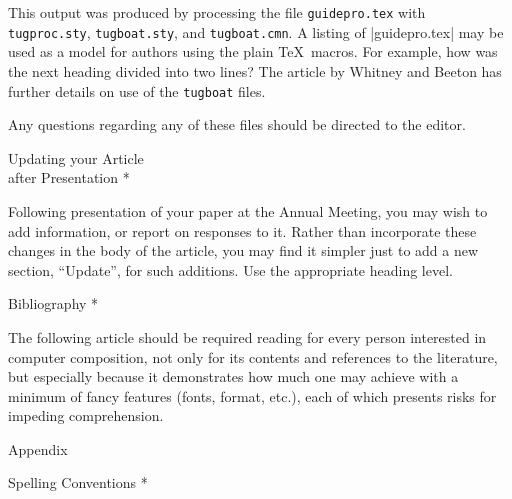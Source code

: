 This output was produced by processing the file {\tt guidepro.tex} with
{\tt tugproc.sty}, {\tt tugboat.sty}, and {\tt tugboat.cmn}.  A listing
of |guidepro.tex| may be used as a model for authors using the plain
\TeX\ macros.  For example, how was the next heading divided into two
lines? The article by Whitney and Beeton has further details on
use of the {\tt *tugboat} files.

Any questions regarding any of these files should be directed to the
editor.
 
\head * Updating your Article\\ after Presentation *
 
Following presentation of your paper at the Annual Meeting, you may wish
to add information, or report on responses to it.  Rather than
incorporate these changes in the body of the article, you may find it
simpler just to add a new section, ``Update'', for such additions.  Use
the appropriate heading level.
 
\head * Bibliography *
 


 
\medskip
 
The following article should be required reading for every person
interested in computer composition, not only for its contents and
references to the literature, but especially because it demonstrates how
much one may achieve with a minimum of fancy features (fonts, format,
etc.), each of which presents risks for impeding comprehension.
 
\medskip
 
 
\appendix Appendix\endappendix
 
\head * Spelling Conventions *
 
 
